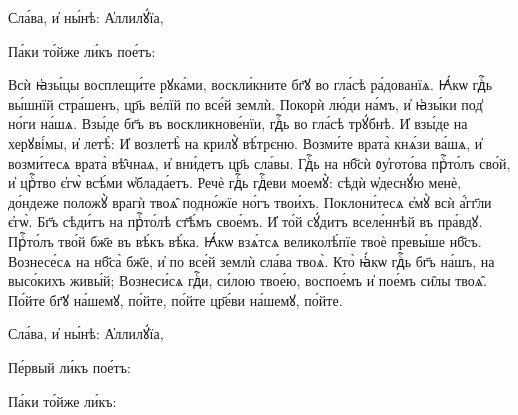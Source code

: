 \hKv Сла́ва, и҆ ны́нѣ: А҆ллилꙋ́їа,  



%
Па́ки то́йже ли́къ пое́тъ: 

\cuLettrine
Всѝ ꙗ҆зы́цы восплещи́те рꙋка́ми, воскли́кните бг҃ꙋ во  гла́сѣ ра́дованїѧ. 
\hKv Ꙗ҆́кѡ гдⷭ҇ь вы́шнїй стра́шенъ,  цр҃ь ве́лїй по все́й землѝ. 
\hKv Покорѝ лю́ди на́мъ, и҆  ꙗ҆зы́ки под̾ но́ги на́шѧ. 
\hKv Взы́де бг҃ъ въ  воскликнове́нїи, гдⷭ҇ь во гла́сѣ трꙋ́бнѣ. 
\hKv И҆ взы́де  на херꙋві́мы, и҆ летѣ̀: 
\hKv И҆ возлетѣ̀ на крилꙋ̀  вѣ́трєню. 
\hKv Возми́те врата̀ кнѧ́зи ва́шѧ, и҆ возми́тесѧ  врата̀ вѣ̑чнаѧ, и҆ вни́детъ цр҃ь сла́вы. 
\hKv Гдⷭ҇ь на  нб҃сѝ ᲂу҆гото́ва прⷭ҇то́лъ сво́й, и҆ црⷭ҇тво є҆гѡ̀  всѣ́ми ѡ҆блада́етъ. 
\hKv Речѐ гдⷭ҇ь гдⷭ҇еви моемꙋ̀: сѣдѝ  ѡ҆деснꙋ́ю менѐ, до́ндеже положꙋ̀ врагѝ твоѧ̑ подно́жїе  но́гъ твои́хъ. 
\hKv Поклони́тесѧ є҆мꙋ̀ всѝ а҆́гг҃ли  є҆гѡ̀. 
\hKv Бг҃ъ сѣди́тъ на прⷭ҇то́лѣ ст҃ѣ́мъ свое́мъ.  
\hKv И҆ то́й сꙋ́дитъ вселе́ннѣй въ пра́вдꙋ. 
\hKv Прⷭ҇то́лъ  тво́й бж҃е въ вѣ́къ вѣ́ка. 
\hKv Ꙗ҆́кѡ взѧ́тсѧ  великолѣ́пїе твоѐ превы́ше нб҃съ. 
\hKv Вознесе́сѧ на  нб҃са̀ бж҃е, и҆ по все́й землѝ сла́ва твоѧ̀. 
\hKv Кто̀  ꙗ҆́кѡ гдⷭ҇ь бг҃ъ на́шъ, на   высо́кихъ живы́й; 
\hKv Вознеси́сѧ гдⷭ҇и, си́лою твое́ю,  воспое́мъ и҆ пое́мъ си̑лы твоѧ̑. 
\hKv По́йте бг҃ꙋ на́шемꙋ,  по́йте, по́йте цр҃е́ви на́шемꙋ, по́йте. 

\hKv Сла́ва, и҆ ны́нѣ: А҆ллилꙋ́їа,  

%
Пе́рвый ли́къ пое́тъ: 

%
Па́ки то́йже ли́къ: 

